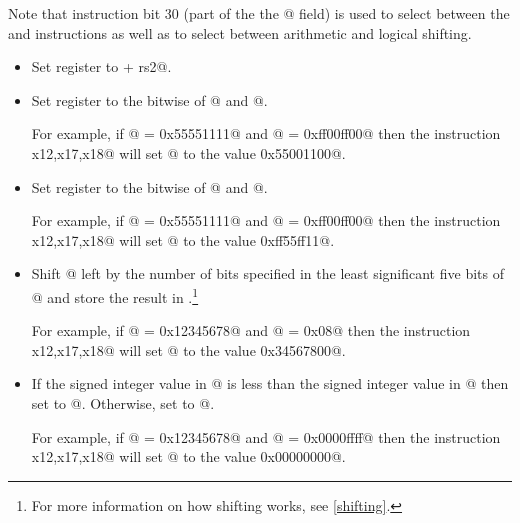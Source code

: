 Note that instruction bit 30 (part of the the @ field) 
is used to select between the \verb@add@ and \verb@sub@ instructions 
as well as to select between arithmetic and logical shifting.

\begin{itemize}
\item{}
\label{insn:add}

Set register \verb@rd@ to  + rs2@.

\item{}
\label{insn:and}

Set register \verb@rd@ to the bitwise \verb@and@ of @ and  @.

For example, if @ = \verb@0x55551111@ and @ = \verb@0xff00ff00@
then the instruction \verb@and x12,x17,x18@ will set @ to the
value \verb@0x55001100@.

\item{}
\label{insn:or}

Set register \verb@rd@ to the bitwise \verb@or@ of @ and  @.

For example, if @ = \verb@0x55551111@ and @ = \verb@0xff00ff00@
then the instruction \verb@or x12,x17,x18@ will set @ to the
value \verb@0xff55ff11@.

\item{}
\label{insn:sll}

Shift @ left by the number of bits specified in the least significant
five bits of @ and store the result in \verb@rd@.\footnote{For
more information on how shifting works, see \autoref{shifting}.}

For example, if @ = \verb@0x12345678@ and @ = \verb@0x08@
then the instruction \verb@sll x12,x17,x18@ will set @ to the
value \verb@0x34567800@.

\item{}
\label{insn:slt}

If the signed integer value in @ is less than the
signed integer value in @ then set \verb@rd@ to @.
Otherwise, set \verb@rd@ to @.

For example, if @ = \verb@0x12345678@ and @ = \verb@0x0000ffff@
then the instruction \verb@slt x12,x17,x18@ will set @ to the
value \verb@0x00000000@.


\end{itemize}
